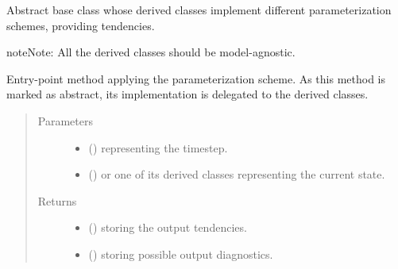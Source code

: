 \documentclass[letterpaper,10pt,english]{sphinxmanual}
\begin{document}

\begin{fulllineitems}
\label{\detokenize{api:parameterizations.tendency.Tendency}}
Abstract base class whose derived classes implement different parameterization schemes, providing tendencies.

\begin{sphinxadmonition}{note}{Note:}
All the derived classes should be model-agnostic.
\end{sphinxadmonition}

\begin{fulllineitems}
\label{\detokenize{api:parameterizations.tendency.Tendency.__call__}}
Entry-point method applying the parameterization scheme.
As this method is marked as abstract, its implementation is delegated to the derived classes.
\begin{quote}\begin{description}
\item[{Parameters}] \leavevmode\begin{itemize}
\item {} 
 () \textendash{}  representing the timestep.

\item {} 
 () \textendash{} {\hyperref[\detokenize{api:storages.grid_data.GridData}]{}} or one of its derived classes representing the current state.

\end{itemize}

\item[{Returns}] \leavevmode
\begin{itemize}
\item {} 
 () \textendash{} {\hyperref[\detokenize{api:storages.grid_data.GridData}]{}} storing the output tendencies.

\item {} 
 () \textendash{} {\hyperref[\detokenize{api:storages.grid_data.GridData}]{}} storing possible output diagnostics.


\end{itemize}
\end{description}
\end{quote}
\end{fulllineitems}
\end{fulllineitems}
\end{document}
